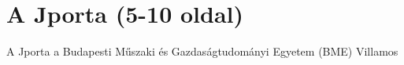 \chapter{A Jporta (5-10 oldal)}\label{chapter:jporta}

A Jporta a Budapesti Műszaki és Gazdaságtudományi Egyetem (BME) Villamos